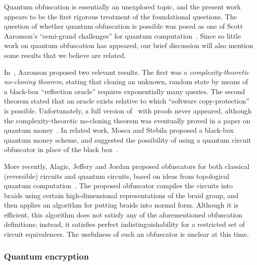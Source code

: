 \documentclass[envcountsame]{llncs}
\numberwithin{equation}{section}
\begin{document}
Quantum obfuscation is essentially an unexplored topic, and the present work appears to be the first rigorous treatment of the foundational questions. The question of whether quantum obfuscation is possible was posed as one of Scott Aaronson's ``semi-grand challenges'' for quantum computation~\cite{Aar05}. Since so little work on quantum obfuscation has appeared, our brief discussion will also mention some results that we believe are related. 

In~\cite{Aar09}, Aaronson proposed two relevant results. The first was a \emph{complexity-theoretic no-cloning theorem}, stating that cloning an unknown, random state by means of a black-box ``reflection oracle'' requires exponentially many queries. The second theorem stated that an oracle exists relative to which ``software copy-protection'' is possible. Unfortunately, a full version of~\cite{Aar09} with proofs never appeared, although the complexity-theoretic no-cloning theorem was eventually proved in a paper on quantum money~\cite{AC12}. In related work, Mosca and Stebila proposed a black-box quantum money scheme, and suggested the possibility of using a quantum circuit obfuscator in place of the black box~\cite{MS10}.

More recently, Alagic, Jeffery and Jordan proposed obfuscators for both classical (reversible) circuits and quantum circuits, based on ideas from topological quantum computation~\cite{AJJ14}. The proposed obfuscator compiles the circuits into braids using certain high-dimensional representations of the braid group, and then applies an algorithm for putting braids into normal form. Although it is efficient, this algorithm does not satisfy any of the aforementioned obfuscation definitions; instead, it satisfies perfect indistinguishability for a restricted set of circuit equivalences. The usefulness of such an obfuscator is unclear at this time.

\subsubsection{Quantum encryption}
\end{document}
